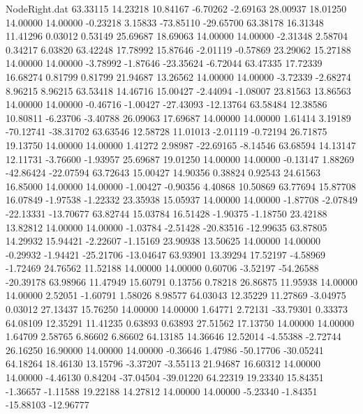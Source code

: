 \begin{filecontents}{NodeRight.dat}
  63.33115   14.23218   10.84167    -6.70262   -2.69163   28.00937   18.01250   14.00000   14.00000   -0.23218    3.15833  -73.85110  -29.65700
  63.38178   16.31348   11.41296     0.03012    0.53149   25.69687   18.69063   14.00000   14.00000   -2.31348    2.58704    0.34217    6.03820
  63.42248   17.78992   15.87646    -2.01119   -0.57869   23.29062   15.27188   14.00000   14.00000   -3.78992   -1.87646  -23.35624   -6.72044
  63.47335   17.72339   16.68274     0.81799    0.81799   21.94687   13.26562   14.00000   14.00000   -3.72339   -2.68274    8.96215    8.96215
  63.53418   14.46716   15.00427    -2.44094   -1.08007   23.81563   13.86563   14.00000   14.00000   -0.46716   -1.00427  -27.43093  -12.13764
  63.58484   12.38586   10.80811    -6.23706   -3.40788   26.09063   17.69687   14.00000   14.00000    1.61414    3.19189  -70.12741  -38.31702
  63.63546   12.58728   11.01013    -2.01119   -0.72194   26.71875   19.13750   14.00000   14.00000    1.41272    2.98987  -22.69165   -8.14546
  63.68594   14.13147   12.11731    -3.76600   -1.93957   25.69687   19.01250   14.00000   14.00000   -0.13147    1.88269  -42.86424  -22.07594
  63.72643   15.00427   14.90356     0.38824    0.92543   24.61563   16.85000   14.00000   14.00000   -1.00427   -0.90356    4.40868   10.50869
  63.77694   15.87708   16.07849    -1.97538   -1.22332   23.35938   15.05937   14.00000   14.00000   -1.87708   -2.07849  -22.13331  -13.70677
  63.82744   15.03784   16.51428    -1.90375   -1.18750   23.42188   13.82812   14.00000   14.00000   -1.03784   -2.51428  -20.83516  -12.99635
  63.87805   14.29932   15.94421    -2.22607   -1.15169   23.90938   13.50625   14.00000   14.00000   -0.29932   -1.94421  -25.21706  -13.04647
  63.93901   13.39294   17.52197    -4.58969   -1.72469   24.76562   11.52188   14.00000   14.00000    0.60706   -3.52197  -54.26588  -20.39178
  63.98966   11.47949   15.60791     0.13756    0.78218   26.86875   11.95938   14.00000   14.00000    2.52051   -1.60791    1.58026    8.98577
  64.03043   12.35229   11.27869    -3.04975    0.03012   27.13437   15.76250   14.00000   14.00000    1.64771    2.72131  -33.79301    0.33373
  64.08109   12.35291   11.41235     0.63893    0.63893   27.51562   17.13750   14.00000   14.00000    1.64709    2.58765    6.86602    6.86602
  64.13185   14.36646   12.52014    -4.55388   -2.72744   26.16250   16.90000   14.00000   14.00000   -0.36646    1.47986  -50.17706  -30.05241
  64.18264   18.46130   13.15796    -3.37207   -3.55113   21.94687   16.60312   14.00000   14.00000   -4.46130    0.84204  -37.04504  -39.01220
  64.22319   19.23340   15.84351    -1.36657   -1.11588   19.22188   14.27812   14.00000   14.00000   -5.23340   -1.84351  -15.88103  -12.96777

\end{filecontents}
